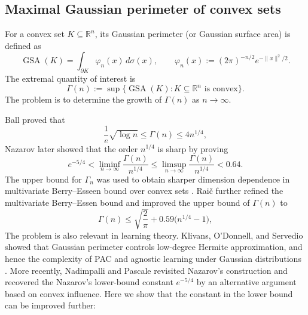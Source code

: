 \documentclass[11pt]{article}
\newtheorem{remark}[theorem]{Remark}
\begin{document}




\subsection{Maximal Gaussian perimeter of convex sets}

For a convex set \(K\subseteq\mathbb{R}^n\), its Gaussian perimeter (or Gaussian surface area) is defined as
\[
\operatorname{GSA}(K)=\int_{\partial K}\varphi_n(x)\,d\sigma(x),
\qquad
\varphi_n(x):=(2\pi)^{-n/2}e^{-\|x\|^2/2}.
\]
The extremal quantity of interest is
\[
\Gamma(n):=\sup\{\operatorname{GSA}(K):K\subseteq\mathbb{R}^n \text{ is convex}\}.
\] The problem is to determine the growth of \(\Gamma(n)\) as \(n\to\infty\).

Ball\cite{Ball1993} proved that
\[
\frac{1}{e}\sqrt{\log n } \leq \Gamma(n)\le 4n^{1/4},
\]
Nazarov\cite{Nazarov2003} later showed that the order $n^{1/4}$ is sharp by proving
\[
e^{-5/4} < \liminf_{n\to\infty}\frac{\Gamma(n)}{n^{1/4}} \leq \limsup_{n\to\infty}\frac{\Gamma(n)}{n^{1/4}} < 0.64.
\]
The upper bound for $\Gamma_n$ was used to obtain sharper dimension dependence in multivariate Berry--Esseen bound over convex sets \cite{Bentkus03}. Rai\v{c} \cite{Raic2019} further refined the multivariate Berry--Essen bound and improved the upper bound of $\Gamma(n)$ to
\[
\Gamma(n)\le \sqrt{\frac{2}{\pi}}+0.59\bigl(n^{1/4}-1\bigr),
\] 
The problem is also relevant in learning theory. Klivans, O'Donnell, and Servedio showed that
Gaussian perimeter controls low-degree Hermite approximation, and hence the complexity of PAC
and agnostic learning under Gaussian distributions \cite{KOS2008}. More recently, Nadimpalli and Pascale\cite{NadimpalliPascale2025} revisited Nazarov's construction and recovered the Nazarov's lower-bound constant \(e^{-5/4}\) by an
alternative argument based on convex influence. Here we show that the constant in the lower bound can be improved further: 
\end{document}
